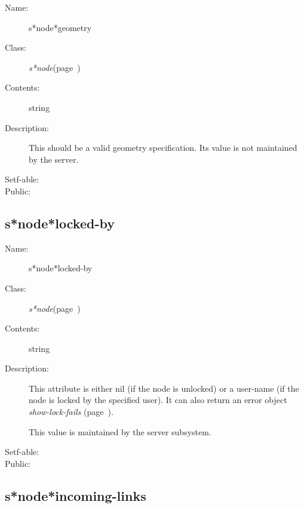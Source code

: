 \begin{description}

\item [Name:]  s*node*geometry

\item [Class:] {\sl s*node}\hfill(page~\pageref{s*node})

\item [Contents:] string

\item [Description:]
This should be a valid geometry
specification.  Its value is not
maintained by the server.

\item [Setf-able:]


\item [Public:]



\end{description}
\horizontalline

\subsection{s*node*locked-by}
\label{s*node*locked-by}

\begin{description}

\item [Name:]  s*node*locked-by

\item [Class:] {\sl s*node}\hfill(page~\pageref{s*node})

\item [Contents:] string

\item [Description:]

This attribute is either nil (if the node is
unlocked) or a user-name (if the node is locked by
the specified user). It can also return an error
object {\sl show-lock-fails} (page~\pageref{show-lock-fails}).

This value is maintained by the server
subsystem.

\item [Setf-able:]


\item [Public:]



\end{description}
\horizontalline

\subsection{s*node*incoming-links}
\label{s*node*incoming-links}

